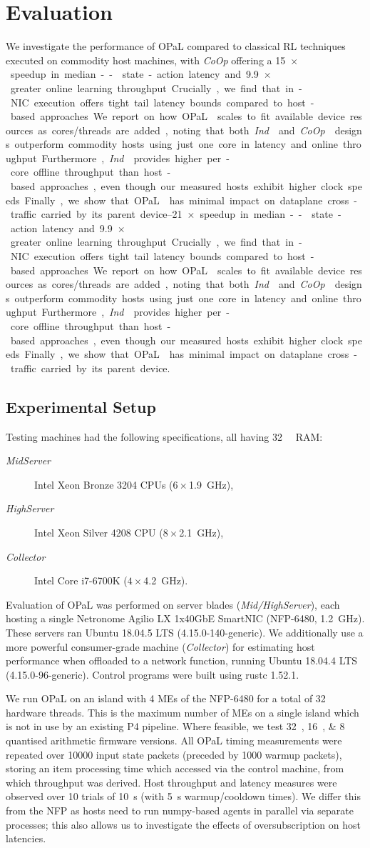 \documentclass[sigconf,natbib=false]{acmart}
\newcommand{\approachshort}{OPaL}
\newcommand{\Coopfw}{\emph{CoOp}}
\newcommand{\Indfw}{\emph{Ind}}
\begin{document}
\section{Evaluation}\label{sec:evaluation}
We investigate the performance of \approachshort{} compared to classical RL techniques executed on commodity host machines, with \Coopfw{} offering a \SIrange{15}{21}{$\times$} speedup in median-- state-action latency and \SI{9.9}{$\times$} greater online learning throughput.
Crucially, we find that in-NIC execution offers tight tail latency bounds compared to host-based approaches.
We report on how \approachshort{} scales to fit available device resources as cores/threads are added, noting that both \Indfw{} and \Coopfw{} designs outperform commodity hosts using just one core in latency and online throughput. 
Furthermore, \Indfw{} provides higher per-core offline throughput than host-based approaches, even though our measured hosts exhibit higher clock speeds.
Finally, we show that \approachshort{} has minimal impact on dataplane cross-traffic carried by its parent device.

\subsection{Experimental Setup}\label{sec:experimental-setup}
Testing machines had the following specifications, all having \SI{32}{\gibi\byte} RAM:
\begin{description}
	\item[\emph{MidServer}] Intel Xeon Bronze 3204 CPUs ($6\times$\SI{1.9}{\giga\hertz}),
	\item[\emph{HighServer}] Intel Xeon Silver 4208 CPU ($8\times$\SI{2.1}{\giga\hertz}),
	\item[\emph{Collector}] Intel Core i7-6700K ($4\times$\SI{4.2}{\giga\hertz}).
\end{description}
Evaluation of \approachshort{} was performed on server blades (\emph{Mid/HighServer}), each hosting a single Netronome Agilio LX 1x40GbE SmartNIC (NFP-6480, \SI{1.2}{\giga\hertz}).
These servers ran Ubuntu 18.04.5 LTS (4.15.0-140-generic).
We additionally use a more powerful consumer-grade machine (\emph{Collector}) for estimating host performance when offloaded to a network function, running Ubuntu 18.04.4 LTS (4.15.0-96-generic).
Control programs were built using rustc 1.52.1.

We run \approachshort{} on an island with \num{4} MEs of the NFP-6480 for a total of \num{32} hardware threads.
This is the maximum number of MEs on a single island which is not in use by an existing P4 pipeline.
Where feasible, we test \SIlist{32;16;8}{\bit} quantised arithmetic firmware versions.
All \approachshort{} timing measurements were repeated over \num{10000} input state packets (preceded by \num{1000} warmup packets), storing an item processing time which accessed via the control machine, from which throughput was derived.
Host throughput and latency measures were observed over \num{10} trials of \SI{10}{\second} (with \SI{5}{\second} warmup/cooldown times).
We differ this from the NFP as hosts need to run numpy-based agents in parallel via separate processes; this also allows us to investigate the effects of oversubscription on host latencies.
\end{document}
